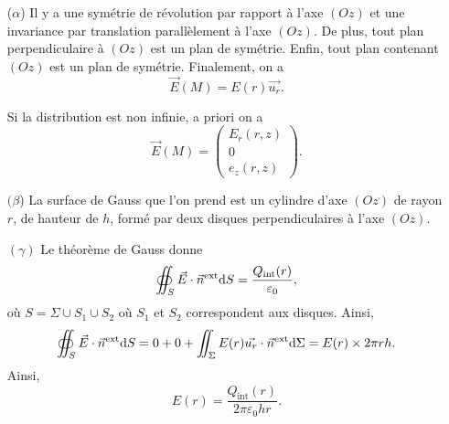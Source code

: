             \begin{itemize}
                \item [($\alpha$)] Il y a une symétrie de révolution par rapport à l'axe $(Oz)$ et une invariance par translation parallèlement à l'axe $(Oz)$. De plus, tout plan perpendiculaire à $(Oz)$ est un plan de symétrie. Enfin, tout plan contenant $(Oz)$ est un plan de symétrie. Finalement, on a 
                \begin{equation*}
                    \boxed{
                    \vec{E}(M)=E(r)\vec{u_r}.
                    }
                \end{equation*}
                \begin{remark}
                    Si la distribution est non infinie, a priori on a 
                    \begin{equation*}
                        \vec{E}(M)=\begin{pmatrix}
                            E_r(r,z)\\0\\e_z(r,z)
                        \end{pmatrix}.
                    \end{equation*}
                \end{remark}

                \item [$(\beta$)] La surface de Gauss que l'on prend est un cylindre d'axe $(Oz)$ de rayon $r$, de hauteur de $h$, formé par deux disques perpendiculaires à l'axe $(Oz)$.
                
                \item [$(\gamma)$] Le théorème de Gauss donne
                \begin{equation*}
                    \oiint_{S}\vec{E}\cdot\vec{n}^{\text{ext}}\mathrm{d} S=\frac{Q_{\text{int}}(r)}{\varepsilon_{0}},
                \end{equation*}
                où $S=\Sigma\cup S_1\cup S_2$ où $S_1$ et $S_2$ correspondent aux disques. Ainsi, 
                \begin{equation*}
                    \oiint_{S}\vec{E}\cdot\vec{n}^{\text{ext}}\mathrm{d} S=0+0+\iint_{\Sigma}E(r)\vec{u_r}\cdot\vec{n}^{\text{ext}}\mathrm{d} \Sigma=E(r)\times 2\pi r h.
                \end{equation*}
                Ainsi,
                \begin{equation*}
                    \boxed{
                        E(r)=\frac{Q_{\text{int}}(r)}{2\pi\varepsilon_{0}hr}.
                    }
                \end{equation*}

            \end{itemize}

